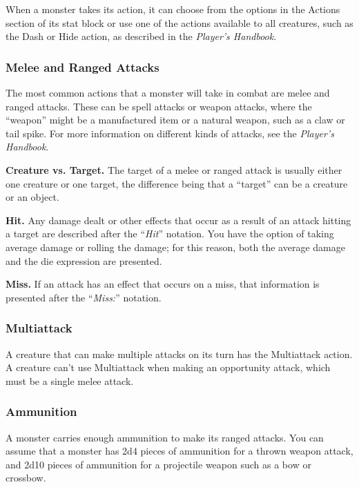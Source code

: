\documentclass[
]{article}
\begin{document}
When a monster takes its action, it can choose from the options in the
Actions section of its stat block or use one of the actions available to
all creatures, such as the Dash or Hide action, as described in the
\emph{Player's Handbook}.

\hypertarget{melee-and-ranged-attacks}{%
\subsubsection{Melee and Ranged
Attacks}\label{melee-and-ranged-attacks}}

The most common actions that a monster will take in combat are melee and
ranged attacks. These can be spell attacks or weapon attacks, where the
``weapon'' might be a manufactured item or a natural weapon, such as a
claw or tail spike. For more information on different kinds of attacks,
see the \emph{Player's Handbook}.

\textbf{Creature vs. Target.} The target of a melee or ranged attack is
usually either one creature or one target, the difference being that a
``target'' can be a creature or an object.

\textbf{Hit.} Any damage dealt or other effects that occur as a result
of an attack hitting a target are described after the ``\emph{Hit}''
notation. You have the option of taking average damage or rolling the
damage; for this reason, both the average damage and the die expression
are presented.

\textbf{Miss.} If an attack has an effect that occurs on a miss, that
information is presented after the ``\emph{Miss:}'' notation.

\hypertarget{multiattack}{%
\subsubsection{Multiattack}\label{multiattack}}

A creature that can make multiple attacks on its turn has the
Multiattack action. A creature can't use Multiattack when making an
opportunity attack, which must be a single melee attack.

\hypertarget{ammunition}{%
\subsubsection{Ammunition}\label{ammunition}}

A monster carries enough ammunition to make its ranged attacks. You can
assume that a monster has 2d4 pieces of ammunition for a thrown weapon
attack, and 2d10 pieces of ammunition for a projectile weapon such as a
bow or crossbow.
\end{document}
